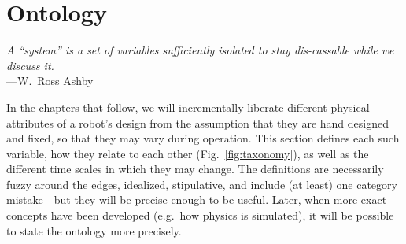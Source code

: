 \section{Ontology}
\label{sec:ontology}

\begin{changemargin}{4em}{4em} 

\vspace{1em}

    \textit{A ``system'' is a set of variables sufficiently isolated to stay dis-cassable while we discuss it.} \\[4pt]
    \hspace*{16.5em} ---W.~Ross Ashby
    
\vspace{1em}
    
    
\end{changemargin}

\noindent
In the chapters that follow, we will incrementally liberate different physical attributes of a robot's design from the assumption that they are hand designed and fixed, so that they may vary during operation.
This section 
defines each such variable, 
how they relate to each other (Fig.~\ref{fig:taxonomy}), 
as well as the different time scales in which they may change.
The definitions are necessarily fuzzy around the edges, idealized, stipulative, and include (at least) one category mistake---but they will be precise enough to be useful.
Later, when more exact concepts have been developed (e.g.~how physics is simulated), it will be possible to state the ontology more precisely.%


